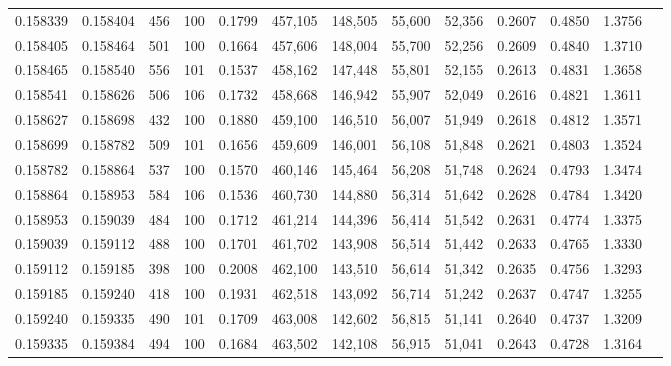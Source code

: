 \begin{tabular}{rrrrrrrrrrrrr}
0.158339 & 0.158404 &   456 & 100 &                                     0.1799 & 457,105 & 148,505 &  55,600 &  52,356 & 0.2607 & 0.4850 & 1.3756 \\
0.158405 & 0.158464 &   501 & 100 &                                     0.1664 & 457,606 & 148,004 &  55,700 &  52,256 & 0.2609 & 0.4840 & 1.3710 \\
0.158465 & 0.158540 &   556 & 101 &                                     0.1537 & 458,162 & 147,448 &  55,801 &  52,155 & 0.2613 & 0.4831 & 1.3658 \\
0.158541 & 0.158626 &   506 & 106 &                                     0.1732 & 458,668 & 146,942 &  55,907 &  52,049 & 0.2616 & 0.4821 & 1.3611 \\
0.158627 & 0.158698 &   432 & 100 &                                     0.1880 & 459,100 & 146,510 &  56,007 &  51,949 & 0.2618 & 0.4812 & 1.3571 \\
0.158699 & 0.158782 &   509 & 101 &                                     0.1656 & 459,609 & 146,001 &  56,108 &  51,848 & 0.2621 & 0.4803 & 1.3524 \\
0.158782 & 0.158864 &   537 & 100 &                                     0.1570 & 460,146 & 145,464 &  56,208 &  51,748 & 0.2624 & 0.4793 & 1.3474 \\
0.158864 & 0.158953 &   584 & 106 &                                     0.1536 & 460,730 & 144,880 &  56,314 &  51,642 & 0.2628 & 0.4784 & 1.3420 \\
0.158953 & 0.159039 &   484 & 100 &                                     0.1712 & 461,214 & 144,396 &  56,414 &  51,542 & 0.2631 & 0.4774 & 1.3375 \\
0.159039 & 0.159112 &   488 & 100 &                                     0.1701 & 461,702 & 143,908 &  56,514 &  51,442 & 0.2633 & 0.4765 & 1.3330 \\
0.159112 & 0.159185 &   398 & 100 &                                     0.2008 & 462,100 & 143,510 &  56,614 &  51,342 & 0.2635 & 0.4756 & 1.3293 \\
0.159185 & 0.159240 &   418 & 100 &                                     0.1931 & 462,518 & 143,092 &  56,714 &  51,242 & 0.2637 & 0.4747 & 1.3255 \\
0.159240 & 0.159335 &   490 & 101 &                                     0.1709 & 463,008 & 142,602 &  56,815 &  51,141 & 0.2640 & 0.4737 & 1.3209 \\
0.159335 & 0.159384 &   494 & 100 &                                     0.1684 & 463,502 & 142,108 &  56,915 &  51,041 & 0.2643 & 0.4728 & 1.3164 \\

\end{tabular}
